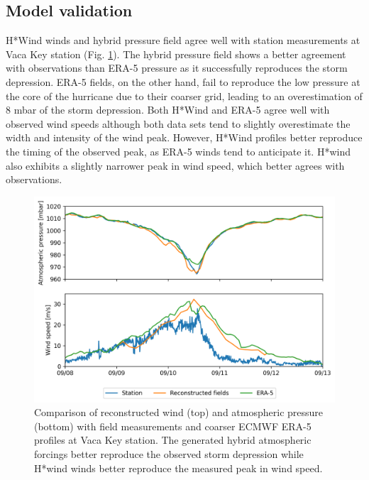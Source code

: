 \documentclass[preprint,12pt,authoryear]{elsarticle}
\begin{document}
\subsection{Model validation}

H*Wind winds and hybrid pressure field agree well with station measurements at Vaca Key station (Fig. \ref{fig:forcings}). The hybrid pressure field shows a better agreement with observations than ERA-5 pressure as it successfully reproduces the storm depression. ERA-5 fields, on the other hand, fail to reproduce the low pressure at the core of the hurricane due to their coarser grid, leading to an overestimation of 8 mbar of the storm depression. Both H*Wind and ERA-5 agree well with observed wind speeds although both data sets tend to slightly overestimate the width and intensity of the wind peak. However, H*Wind profiles better reproduce the timing of the observed peak, as ERA-5 winds tend to anticipate it. H*wind also exhibits a slightly narrower peak in wind speed, which better agrees with observations.

\begin{figure}
    \centering
    \includegraphics[width=.95\textwidth]{validation_met_2.png}
    \caption{Comparison of reconstructed wind (top) and atmospheric pressure (bottom) with field measurements and coarser ECMWF ERA-5 profiles at Vaca Key station. The generated hybrid atmospheric forcings better reproduce the observed storm depression while H*wind winds better reproduce the measured peak in wind speed.}
    \label{fig:forcings}
\end{figure}
\end{document}
